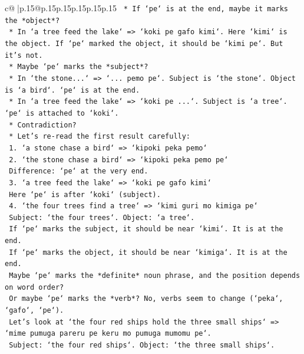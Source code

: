 \documentclass{article}
\begin{document}
{\begin{supertabular}{c@{$\;$}|p{.15\linewidth}@{}p{.15\linewidth}p{.15\linewidth}p{.15\linewidth}p{.15\linewidth}p{.15\linewidth}}
{{{\texttt{                *   If `pe` is at the end, maybe it marks the *object*?} \\
\texttt{                *   In `a tree feed the lake` => `koki pe gafo kimi`. Here `kimi` is the object. If `pe` marked the object, it should be `kimi pe`. But it's not.} \\
\texttt{                *   Maybe `pe` marks the *subject*?} \\
\texttt{                *   In `the stone...` => `... pemo pe`. Subject is `the stone`. Object is `a bird`. `pe` is at the end.} \\
\texttt{                *   In `a tree feed the lake` => `koki pe ...`. Subject is `a tree`. `pe` is attached to `koki`.} \\
\texttt{                *   Contradiction?} \\
\texttt{                *   Let's re{-}read the first result carefully:} \\
\texttt{                    1. `a stone chase a bird` => `kipoki peka pemo`} \\
\texttt{                    2. `the stone chase a bird` => `kipoki peka pemo pe`} \\
\texttt{                    Difference: `pe` at the very end.} \\
\texttt{                    3. `a tree feed the lake` => `koki pe gafo kimi`} \\
\texttt{                    Here `pe` is after `koki` (subject).} \\
\texttt{                    4. `the four trees find a tree` => `kimi guri mo kimiga pe`} \\
\texttt{                    Subject: `the four trees`. Object: `a tree`.} \\
\texttt{                    If `pe` marks the subject, it should be near `kimi`. It is at the end.} \\
\texttt{                    If `pe` marks the object, it should be near `kimiga`. It is at the end.} \\
\texttt{                    Maybe `pe` marks the *definite* noun phrase, and the position depends on word order?} \\
\texttt{                    Or maybe `pe` marks the *verb*? No, verbs seem to change (`peka`, `gafo`, `pe`).} \\
\texttt{                    Let's look at `the four red ships hold the three small ships` => `mime pumuga pareru pe keru mo pumuga mumomu pe`.} \\
\texttt{                    Subject: `the four red ships`. Object: `the three small ships`.} \\
}}}
\end{supertabular}}
\end{document}
